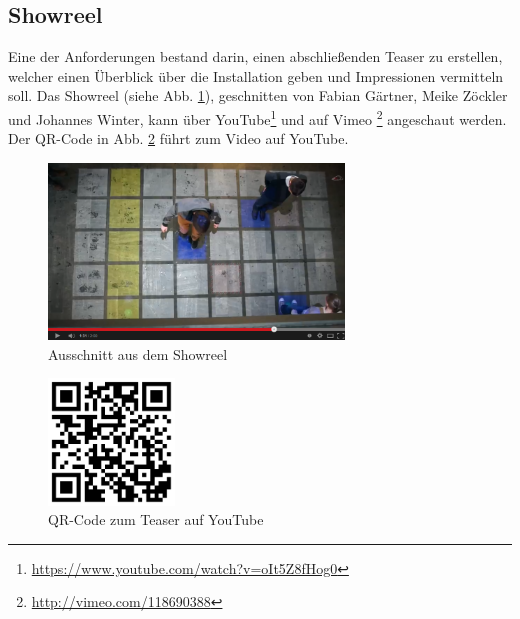 \subsection{Showreel}

Eine der Anforderungen bestand darin, einen abschließenden Teaser zu erstellen, welcher einen Überblick über die Installation geben und Impressionen vermitteln soll. Das Showreel (siehe Abb. \ref{fig:showreel}), geschnitten von Fabian Gärtner, Meike Zöckler und Johannes Winter, kann über YouTube\footnote{\url{https://www.youtube.com/watch?v=oIt5Z8fHog0}} und auf Vimeo \footnote{\url{http://vimeo.com/118690388}} angeschaut werden. Der QR-Code in Abb. \ref{fig:qrcode} führt zum Video auf YouTube.

\begin{figure}[htbp]
	\centering
		\includegraphics[width=0.7\textwidth]{images/showreel.png}
	\caption{Ausschnitt aus dem Showreel}
	\label{fig:showreel}
\end{figure}

\begin{figure}[htbp]
	\centering
		\includegraphics[width=0.3\textwidth]{images/qrcode.png}
	\caption{QR-Code zum Teaser auf YouTube}
	\label{fig:qrcode}
\end{figure}

